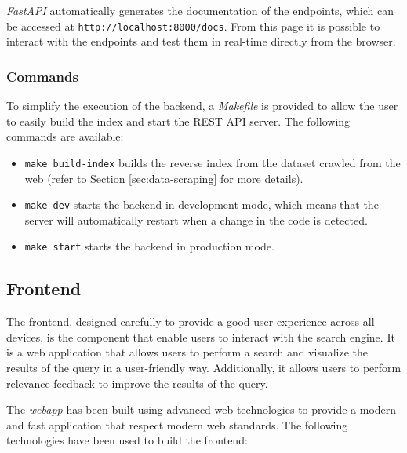 \textit{FastAPI} automatically generates the documentation of the endpoints, which can be accessed at \texttt{http://localhost:8000/docs}. From this page it is possible to interact with the endpoints and test them in real-time directly from the browser.

\subsubsection{Commands}

To simplify the execution of the backend, a \textit{Makefile} is provided to allow the user to easily build the index and start the REST API server. The following commands are available:

\begin{itemize}
  \item \texttt{make build-index} builds the reverse index from the dataset crawled from the web (refer to Section \ref{sec:data-scraping} for more details).
  \item \texttt{make dev} starts the backend in development mode, which means that the server will automatically restart when a change in the code is detected.
  \item \texttt{make start} starts the backend in production mode.
\end{itemize}

\subsection{Frontend}

The frontend, designed carefully to provide a good user experience across all devices, is the component that enable users to interact with the search engine. It is a web application that allows users to perform a search and visualize the results of the query in a user-friendly way. Additionally, it allows users to perform relevance feedback to improve the results of the query.

The \textit{webapp} has been built using advanced web technologies to provide a modern and fast application that respect modern web standards. The following technologies have been used to build the frontend:

